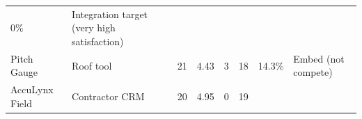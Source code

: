 \documentclass[
  10pt,
]{article}
\begin{document}
\begin{longtable}[]{@{}llllllll@{}}
\begin{minipage}[t]{0.10\columnwidth}
0\%\strut
\end{minipage} & \begin{minipage}[t]{0.10\columnwidth}\raggedright
Integration target (very high satisfaction)\strut
\end{minipage}\tabularnewline
\begin{minipage}[t]{0.10\columnwidth}\raggedright
Pitch Gauge\strut
\end{minipage} & \begin{minipage}[t]{0.10\columnwidth}\raggedright
Roof tool\strut
\end{minipage} & \begin{minipage}[t]{0.10\columnwidth}\raggedright
21\strut
\end{minipage} & \begin{minipage}[t]{0.10\columnwidth}\raggedright
4.43\strut
\end{minipage} & \begin{minipage}[t]{0.10\columnwidth}\raggedright
3\strut
\end{minipage} & \begin{minipage}[t]{0.10\columnwidth}\raggedright
18\strut
\end{minipage} & \begin{minipage}[t]{0.10\columnwidth}\raggedright
14.3\%\strut
\end{minipage} & \begin{minipage}[t]{0.10\columnwidth}\raggedright
Embed (not compete)\strut
\end{minipage}\tabularnewline
\begin{minipage}[t]{0.10\columnwidth}\raggedright
AccuLynx Field\strut
\end{minipage} & \begin{minipage}[t]{0.10\columnwidth}\raggedright
Contractor CRM\strut
\end{minipage} & \begin{minipage}[t]{0.10\columnwidth}\raggedright
20\strut
\end{minipage} & \begin{minipage}[t]{0.10\columnwidth}\raggedright
4.95\strut
\end{minipage} & \begin{minipage}[t]{0.10\columnwidth}\raggedright
0\strut
\end{minipage} & \begin{minipage}[t]{0.10\columnwidth}\raggedright
19\strut
\end{minipage} & \begin{minipage}[t]{0.10\columnwidth}\raggedright

\end{minipage}
\end{longtable}
\end{document}
